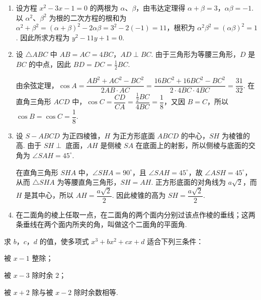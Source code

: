 \begin{solution}
\begin{enumerate}
\item
设方程 \(x^{2}-3x-1=0\) 的两根为 \(\alpha\)、\(\beta\)，由韦达定理得 \(\alpha+\beta=3\)，\(\alpha\beta=-1\). 以 \(\alpha^{2}\)、\(\beta^{2}\) 为根的二次方程的根和为 \(\alpha^{2}+\beta^{2}=\left(\alpha+\beta\right)^{2}-2\alpha\beta=3^{2}-2\left(-1\right)=11\)，根积为 \(\alpha^{2}\beta^{2}=\left(\alpha\beta\right)^{2}=1\). 因此所求方程为 \(y^{2}-11y+1=0\).

\item
设 \(\triangle ABC\) 中 \(AB=AC=4BC\)，\(AD\perp BC\). 由于三角形为等腰三角形，\(D\) 是 \(BC\) 的中点，因此 \(BD=DC=\frac{1}{2}BC\).


由余弦定理，\(\cos A=\dfrac{AB^{2}+AC^{2}-BC^{2}}{2AB\cdot AC}=\dfrac{16BC^{2}+16BC^{2}-BC^{2}}{2\cdot 4BC\cdot 4BC}=\dfrac{31}{32}\). 在直角三角形 \(ACD\) 中，\(\cos C=\dfrac{CD}{CA}=\dfrac{\frac{1}{2}BC}{4BC}=\dfrac{1}{8}\)，又因 \(B=C\)，所以 \(\cos B=\cos C=\dfrac{1}{8}\).

\item
设 \(S-ABCD\) 为正四棱锥，\(H\) 为正方形底面 \(ABCD\) 的中心，\(SH\) 为棱锥的高. 由于 \(SH\perp\) 底面，\(AH\) 是侧棱 \(SA\) 在底面上的射影，所以侧棱与底面的交角为 \(\angle SAH=45^{\circ}\).


在直角三角形 \(SHA\) 中，\(\angle SHA=90^{\circ}\)，且 \(\angle SAH=45^{\circ}\)，故 \(\angle ASH=45^{\circ}\)，从而 \(\triangle SHA\) 为等腰直角三角形，\(SH=AH\). 正方形底面的对角线为 \(a\sqrt{2}\)，而 \(H\) 是其中心，所以 \(AH=\dfrac{a\sqrt{2}}{2}\). 因此棱锥的高为 \(SH=\dfrac{a\sqrt{2}}{2}\).

\item
在二面角的棱上任取一点，在二面角的两个面内分别过该点作棱的垂线；这两条垂线在两个面内所夹的角，叫做这个二面角的平面角.
\end{enumerate}
\end{solution}

\begin{problem}
求 \(b\)，\(c\)，\(d\) 的值，使多项式 \(x^{3}+bx^{2}+cx+d\) 适合下列三条件：

\begin{circlelist}
\item 被 \(x-1\) 整除；
\item 被 \(x-3\) 除时余 \(2\)；
\item 被 \(x+2\) 除与被 \(x-2\) 除时余数相等.
\end{circlelist}
\end{problem}

